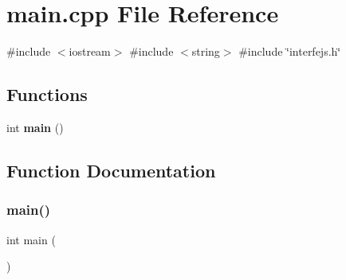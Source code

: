 \section{main.\+cpp File Reference}
\label{main_8cpp}
{\ttfamily \#include $<$iostream$>$}\newline
{\ttfamily \#include $<$string$>$}\newline
{\ttfamily \#include \char`\"{}interfejs.\+h\char`\"{}}\newline
\subsection*{Functions}
\begin{DoxyCompactItemize}
\item 
int \textbf{ main} ()
\end{DoxyCompactItemize}


\subsection{Function Documentation}
\mbox{\label{main_8cpp_ae66f6b31b5ad750f1fe042a706a4e3d4}} 
\subsubsection{main()}
{\footnotesize\ttfamily int main (\begin{DoxyParamCaption}{ }\end{DoxyParamCaption})}

